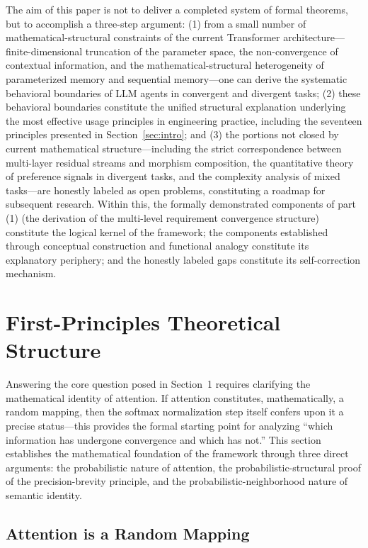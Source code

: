 \documentclass[11pt,a4paper]{article}
\theoremstyle{definition}
\begin{document}
The aim of this paper is not to deliver a completed system of formal theorems, but to accomplish a three-step argument: (1) from a small number of mathematical-structural constraints of the current Transformer architecture---finite-dimensional truncation of the parameter space, the non-convergence of contextual information, and the mathematical-structural heterogeneity of parameterized memory and sequential memory---one can derive the systematic behavioral boundaries of LLM agents in convergent and divergent tasks; (2) these behavioral boundaries constitute the unified structural explanation underlying the most effective usage principles in engineering practice, including the seventeen principles presented in Section~\ref{sec:intro}; and (3) the portions not closed by current mathematical structure---including the strict correspondence between multi-layer residual streams and morphism composition, the quantitative theory of preference signals in divergent tasks, and the complexity analysis of mixed tasks---are honestly labeled as open problems, constituting a roadmap for subsequent research. Within this, the formally demonstrated components of part (1) (the derivation of the multi-level requirement convergence structure) constitute the logical kernel of the framework; the components established through conceptual construction and functional analogy constitute its explanatory periphery; and the honestly labeled gaps constitute its self-correction mechanism.

\section{First-Principles Theoretical Structure}
\label{sec:foundations}

Answering the core question posed in Section~1 requires clarifying the mathematical identity of attention. If attention constitutes, mathematically, a random mapping, then the softmax normalization step itself confers upon it a precise status---this provides the formal starting point for analyzing ``which information has undergone convergence and which has not.'' This section establishes the mathematical foundation of the framework through three direct arguments: the probabilistic nature of attention, the probabilistic-structural proof of the precision-brevity principle, and the probabilistic-neighborhood nature of semantic identity.

\subsection{Attention is a Random Mapping}
\end{document}
